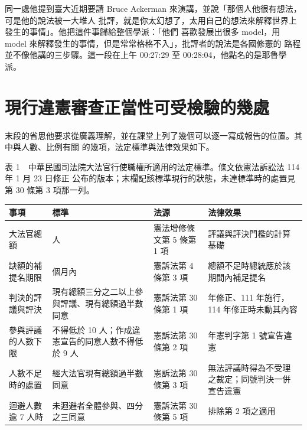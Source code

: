 同一處他提到臺大近期要請 Bruce Ackerman 來演講，並說「那個人他很有想法，可是他的說法被一大堆人
批評，就是你太幻想了，太用自己的想法來解釋世界上發生的事情」。他把這件事歸給整個學派：「他們
喜歡發展出很多 model，用 model 來解釋發生的事情，但是常常格格不入」，批評者的說法是各國修憲的
路程並不像他講的三步驟。這一段在上午 00:27:29 至 00:28:04，他點名的是耶魯學派。

\section{現行違憲審查正當性可受檢驗的幾處}

末段的省思他要求從廣義理解，並在課堂上列了幾個可以逐一寫成報告的位置。其中與人數、比例有關
的幾項，法定標準與法律效果如下。

表 1　中華民國司法院大法官行使職權所適用的法定標準。條文依憲法訴訟法 114 年 1 月 23 日修正
公布的版本；末欄記該標準現行的狀態，未達標準時的處置見第 30 條第 3 項那一列。

\begin{longtable}[]{@{}
  >{\raggedright\arraybackslash}p{}
  >{\raggedright\arraybackslash}p{}
  >{\raggedright\arraybackslash}p{}
  >{\raggedright\arraybackslash}p{}@{}}
\toprule\noalign{}
\begin{minipage}[b]{\linewidth}\raggedright
事項
\end{minipage} & \begin{minipage}[b]{\linewidth}\raggedright
標準
\end{minipage} & \begin{minipage}[b]{\linewidth}\raggedright
法源
\end{minipage} & \begin{minipage}[b]{\linewidth}\raggedright
法律效果
\end{minipage} \\
\midrule\noalign{}
\endhead
\bottomrule\noalign{}
\endlastfoot
大法官總額 & 15 人 & 憲法增修條文第 5 條第 1 項 & 評議與評決門檻的計算基礎 \\
缺額的補提名期限 & 2 個月內 & 憲訴法第 4 條第 3 項 & 總額不足時總統應於該期間內補足提名 \\
判決的評議與評決 & 現有總額三分之二以上參與評議、現有總額過半數同意 & 憲訴法第 30 條第 1 項 & 108 年修正、111 年施行，114 年修正時未動其內容 \\
參與評議的人數下限 & 不得低於 10 人；作成違憲宣告的同意人數不得低於 9 人 & 憲訴法第 30 條第 2 項 & 114 年憲判字第 1 號宣告違憲 \\
人數不足時的處置 & 經大法官現有總額過半數同意 & 憲訴法第 30 條第 3 項 & 無法評議時得為不受理之裁定；同號判決一併宣告違憲 \\
迴避人數逾 7 人時 & 未迴避者全體參與、四分之三同意 & 憲訴法第 30 條第 5 項 & 排除第 2 項之適用 \\
\end{longtable}

